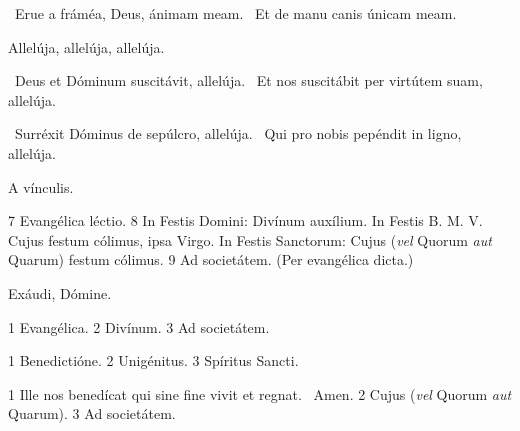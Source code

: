 
\V\ Erue a fráméa, Deus, ánimam meam. \R\ Et de manu canis únicam meam.


 Allelúja, allelúja, allelúja.


\V\ Deus et Dóminum suscitávit, allelúja. \R\ Et nos suscitábit per virtútem suam, allelúja.


\V\ Surréxit Dóminus de sepúlcro, allelúja. \R\ Qui pro nobis pepéndit in ligno, allelúja.


 A vínculis.

 7 Evangélica léctio. 8 In Festis Domini: Divínum auxílium. In Festis B. M. V. Cujus festum cólimus, ipsa Virgo. In Festis Sanctorum: Cujus (\textit{vel} Quorum \textit{aut} Quarum) festum cólimus. 9 Ad societátem. (Per evangélica dicta.)


 Exáudi, Dómine.


 1 Evangélica. 2 Divínum. 3 Ad societátem.


 1 Benedictióne. 2 Unigénitus. 3 Spíritus Sancti.


 1 Ille nos benedícat qui sine fine vivit et regnat. \R\ Amen. 2 Cujus (\textit{vel} Quorum \textit{aut} Quarum). 3 Ad societátem.

\sectionornament


